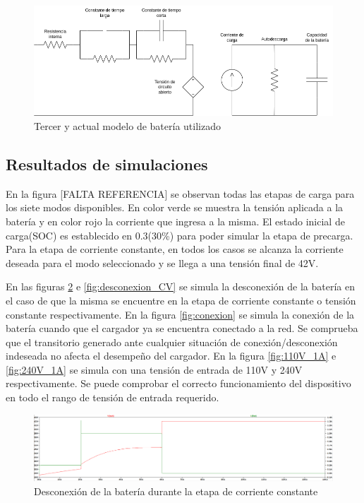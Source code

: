 \begin{figure}
    \centering
    \includegraphics[width=\textwidth]{images/bateria_3.png}
    \caption{Tercer y actual modelo de batería utilizado}
    \label{fig:bateria_3}
\end{figure}

\subsection{Resultados de simulaciones}
En la figura [FALTA REFERENCIA] se observan todas las etapas de carga para los siete modos
disponibles. En color verde se muestra la tensión aplicada a la batería y en
color rojo la corriente que ingresa a la misma. El estado inicial de carga(SOC)
es establecido en 0.3(30\%) para poder simular la etapa de precarga.    
Para la etapa de corriente constante, en todos los casos se alcanza la corriente
deseada para el modo seleccionado y se llega a una tensión final de 42V.

En las figuras \ref{fig:desconexion_CC} e \ref{fig:desconexion_CV} se simula la
desconexión de la batería en el caso de que la misma se encuentre en la etapa de
corriente constante o tensión constante respectivamente. En la figura
\ref{fig:conexion} se simula la conexión de la batería cuando que el cargador
ya se encuentra conectado a la red. Se comprueba que el transitorio generado
ante cualquier situación de conexión/desconexión indeseada no afecta el
desempeño del cargador. En la figura \ref{fig:110V_1A} e \ref{fig:240V_1A} se
simula con una tensión de entrada de 110V y 240V respectivamente. Se puede
comprobar el correcto funcionamiento del dispositivo en todo el rango de tensión
de entrada requerido.

\begin{figure}
    \centering
    \includegraphics[width=\textwidth]{images/desconexion_CC.png}
    \caption{Desconexión de la batería durante la etapa de corriente constante}
    \label{fig:desconexion_CC}
\end{figure}

